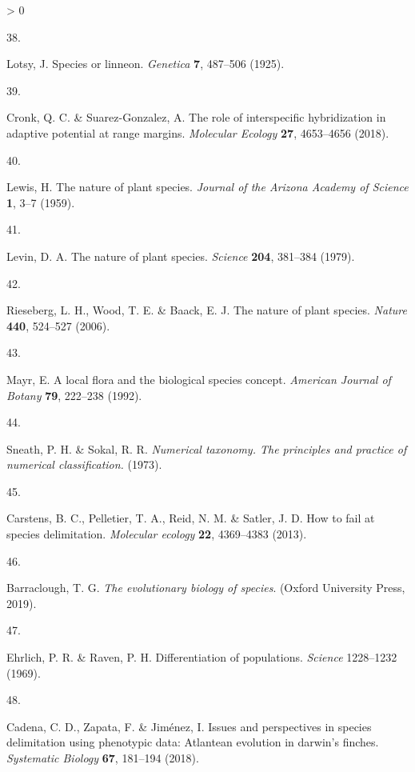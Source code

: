 \documentclass[
  11pt,
]{article}
\newlength{\cslhangindent}
\newlength{\csllabelwidth}
\newenvironment{CSLReferences}[2] %
 {%
  \setlength{\parindent}{0pt}
  \ifodd #1 \everypar{\setlength{\hangindent}{\cslhangindent}}\ignorespaces\fi
  \ifnum #2 > 0
  \setlength{\parskip}{#2\baselineskip}
  \fi
 }%
 {}
\newcommand{\CSLLeftMargin}[1]{\parbox[t]{\csllabelwidth}{#1}}
\newcommand{\CSLRightInline}[1]{\parbox[t]{\linewidth - \csllabelwidth}{#1}\break}
\begin{document}
\begin{CSLReferences}{0}{0}
\leavevmode\hypertarget{ref-lotsy1925species}{}%
\CSLLeftMargin{38. }
\CSLRightInline{Lotsy, J. Species or linneon. \emph{Genetica} \textbf{7}, 487--506 (1925).}

\leavevmode\hypertarget{ref-cronk2018role}{}%
\CSLLeftMargin{39. }
\CSLRightInline{Cronk, Q. C. \& Suarez-Gonzalez, A. The role of interspecific hybridization in adaptive potential at range margins. \emph{Molecular Ecology} \textbf{27}, 4653--4656 (2018).}

\leavevmode\hypertarget{ref-lewis1959nature}{}%
\CSLLeftMargin{40. }
\CSLRightInline{Lewis, H. The nature of plant species. \emph{Journal of the Arizona Academy of Science} \textbf{1}, 3--7 (1959).}

\leavevmode\hypertarget{ref-levin1979nature}{}%
\CSLLeftMargin{41. }
\CSLRightInline{Levin, D. A. The nature of plant species. \emph{Science} \textbf{204}, 381--384 (1979).}

\leavevmode\hypertarget{ref-rieseberg2006nature}{}%
\CSLLeftMargin{42. }
\CSLRightInline{Rieseberg, L. H., Wood, T. E. \& Baack, E. J. The nature of plant species. \emph{Nature} \textbf{440}, 524--527 (2006).}

\leavevmode\hypertarget{ref-mayr1992local}{}%
\CSLLeftMargin{43. }
\CSLRightInline{Mayr, E. A local flora and the biological species concept. \emph{American Journal of Botany} \textbf{79}, 222--238 (1992).}

\leavevmode\hypertarget{ref-sneath1973numerical}{}%
\CSLLeftMargin{44. }
\CSLRightInline{Sneath, P. H. \& Sokal, R. R. \emph{Numerical taxonomy. The principles and practice of numerical classification.} (1973).}

\leavevmode\hypertarget{ref-carstens2013fail}{}%
\CSLLeftMargin{45. }
\CSLRightInline{Carstens, B. C., Pelletier, T. A., Reid, N. M. \& Satler, J. D. How to fail at species delimitation. \emph{Molecular ecology} \textbf{22}, 4369--4383 (2013).}

\leavevmode\hypertarget{ref-barraclough2019evolutionary}{}%
\CSLLeftMargin{46. }
\CSLRightInline{Barraclough, T. G. \emph{The evolutionary biology of species}. (Oxford University Press, 2019).}

\leavevmode\hypertarget{ref-ehrlich1969differentiation}{}%
\CSLLeftMargin{47. }
\CSLRightInline{Ehrlich, P. R. \& Raven, P. H. Differentiation of populations. \emph{Science} 1228--1232 (1969).}

\leavevmode\hypertarget{ref-cadena2018issues}{}%
\CSLLeftMargin{48. }
\CSLRightInline{Cadena, C. D., Zapata, F. \& Jiménez, I. Issues and perspectives in species delimitation using phenotypic data: Atlantean evolution in darwin's finches. \emph{Systematic Biology} \textbf{67}, 181--194 (2018).}


\end{CSLReferences}
\end{document}
